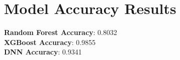 \section*{Model Accuracy Results}
\textbf{Random Forest Accuracy}: 0.8032\\
\textbf{XGBoost Accuracy}: 0.9855\\
\textbf{DNN Accuracy}: 0.9341\\
